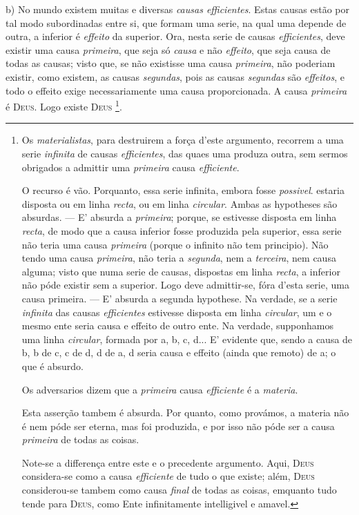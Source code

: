 b) No mundo existem muitas e diversas \emph{causas efficientes}. Estas causas estão por tal modo subordinadas entre si, que formam uma serie, na qual uma depende de outra, a inferior   é \emph{effeito} da superior. Ora, nesta serie de causas \emph{efficientes}, deve existir uma causa \emph{primeira}, que seja só \emph{causa} e não \emph{effeito}, que seja causa de todas as causas; visto que, se não existisse uma  causa \emph{primeira}, não poderiam existir, como existem, as causas \emph{segundas}, pois as causas \emph{segundas} são \emph{effeitos}, e todo o effeito exige necessariamente uma causa proporcionada. A causa \emph{primeira} é \textsc{Deus}. Logo existe \textsc{Deus} \footnote{Os \emph{materialistas}, para destruirem a força d'este argumento, recorrem a uma serie \emph{infinita} de causas \emph{efficientes}, das quaes uma produza outra, sem sermos obrigados a admittir uma \emph{primeira} causa \emph{efficiente}.\par O recurso é vão. Porquanto, essa serie infinita, embora fosse \emph{possivel}. estaria disposta ou em linha \emph{recta}, ou em linha \emph{circular}. Ambas as hypotheses são absurdas. --- E' absurda a \emph{primeira}; porque, se estivesse disposta em linha \emph{recta}, de modo que a causa inferior fosse produzida pela superior, essa serie não teria uma causa \emph{primeira} (porque o infinito não tem principio). Não tendo uma causa \emph{primeira}, não teria a \emph{segunda}, nem a \emph{terceira}, nem causa alguma; visto que numa serie de causas, dispostas em linha \emph{recta}, a inferior não póde existir sem a superior. Logo deve admittir-se, fóra d'esta serie, uma causa primeira. --- E' absurda a segunda hypothese. Na verdade, se a serie \emph{infinita} das causas \emph{efficientes} estivesse disposta em linha \emph{circular}, um e o mesmo ente seria causa e effeito de outro ente. Na verdade, supponhamos uma linha \emph{circular}, formada por a, b, c, d... E' evidente que, sendo a causa de b, b de c, c de d, d de a, d seria causa e effeito (ainda que remoto) de a; o que é absurdo.\par Os adversarios dizem que a \emph{primeira} causa \emph{efficiente} é a \emph{materia}.\par Esta asserção tambem é absurda. Por quanto, como provámos, a materia não é nem póde ser eterna, mas foi produzida, e por isso não póde ser a causa \emph{primeira} de todas as coisas.\par Note-se a differença entre este e o precedente argumento. Aqui, \textsc{Deus} considera-se como a causa \emph{efficiente} de tudo o que existe; além, \textsc{Deus} considerou-se tambem como causa \emph{final} de todas as coisas, emquanto tudo tende para \textsc{Deus}, como Ente infinitamente intelligivel e amavel.}.

